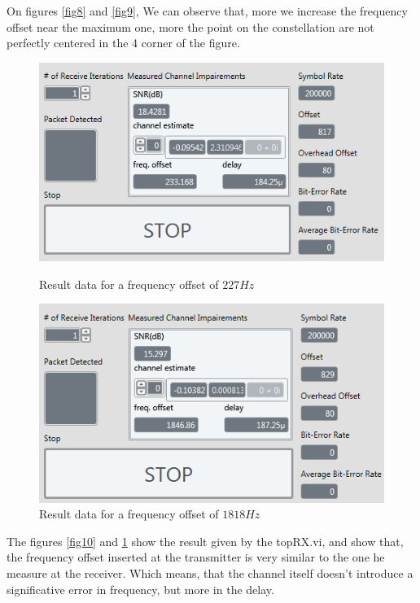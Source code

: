 \documentclass[frenchb, oneside, headings=normal]{scrartcl}
\begin{document}
On figures \ref{fig8} and \ref{fig9}, We can observe that, more we increase the frequency offset near the maximum one, more the point on the constellation are not perfectly centered in the 4 corner of the figure.

\begin{figure}[!ht]
    \begin{minipage}[b]{0.48\linewidth}
        \centering \includegraphics[scale=0.7]{img/USRP_value_227.PNG}
     \caption{Result data for a frequency offset of $227 Hz$}
     \label{fig10}
    \end{minipage}\hfill
    \begin{minipage}[b]{0.48\linewidth}
         \centering \includegraphics[scale=0.7]{img/USRP_value_1818.PNG}
          \caption{Result data for a frequency offset of $1818 Hz$}
          \label{fig11}
    \end{minipage}  
\end{figure}

The figures \ref{fig10} and \ref{fig11} show the result given by the topRX.vi, and show that, the frequency offset inserted at the transmitter is very similar to the one he measure at the receiver. Which means, that the channel itself doesn't introduce a significative error in frequency, but more in the delay.
\end{document}
